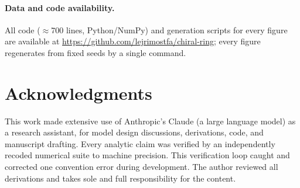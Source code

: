 \documentclass[11pt]{article}
\begin{document}
\paragraph{Data and code availability.}
All code ($\approx$700 lines, Python/NumPy) and generation scripts for every figure are available at \url{https://github.com/lejrimostfa/chiral-ring}; every figure regenerates from fixed seeds by a single command.


\section*{Acknowledgments}
This work made extensive use of Anthropic's Claude (a large language model) as a research assistant, for model design discussions, derivations, code, and manuscript drafting. Every analytic claim was verified by an independently recoded numerical suite to machine precision. This verification loop caught and corrected one convention error during development. The author reviewed all derivations and takes sole and full responsibility for the content.
\end{document}
